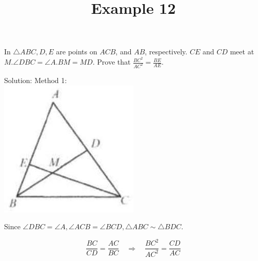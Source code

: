 \documentclass{article}
\title{Example 12}
\date{}
\begin{document}
\maketitle

In \(\triangle A B C, D, E\) are points on \(A C B\), and \(A B\), respectively. \(C E\) and \(C D\) meet at \(M . \angle D B C=\angle A . B M=M D\). Prove that \(\frac{B C^{2}}{A C^{2}}=\frac{B E}{A E}\).

Solution:
Method 1:\\
\centering
\includegraphics[width=\textwidth]{images/115.jpg}

Since \(\angle D B C=\angle A, \angle A C B=\angle B C D, \triangle A B C \sim \triangle B D C\).

\[
\frac{B C}{C D}=\frac{A C}{B C} \quad \Rightarrow \quad \frac{B C^{2}}{A C^{2}}=\frac{C D}{A C}
\]
\end{document}
